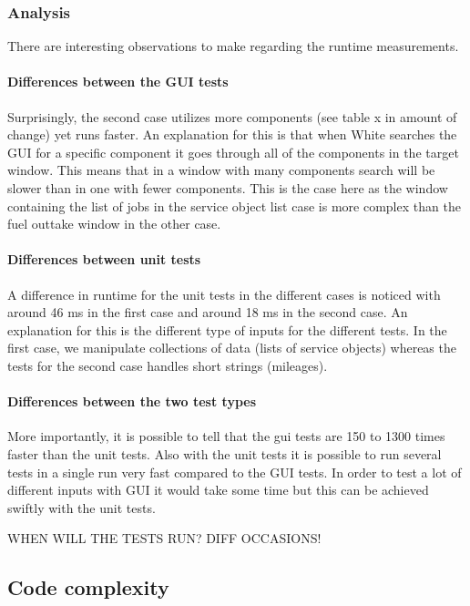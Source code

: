 \documentclass{article}
\begin{document}
			\subsubsection{Analysis}
			There are interesting observations to make regarding the runtime measurements. 

			\paragraph{Differences between the GUI tests}
			Surprisingly, the second case utilizes more components (see table x in amount of change) yet runs faster. An explanation for this is that when White searches the GUI for a specific component it goes through all of the components in the target window. This means that in a window with many components search will be slower than in one with fewer components. This is the case here as the window containing the list of jobs in the service object list case is more complex than the fuel outtake window in the other case.

			\paragraph{Differences between unit tests}
			A difference in runtime for the unit tests in the different cases is noticed with around 46 ms in the first case and around 18 ms in the second case. An explanation for this is the different type of inputs for the different tests. In the first case, we manipulate collections of data (lists of service objects) whereas the tests for the second case handles short strings (mileages).

			\paragraph{Differences between the two test types}			
			More importantly, it is possible to tell that the gui tests are 150 to 1300 times faster than the unit tests. Also with the unit tests it is possible to run several tests in a single run very fast compared to the GUI tests. In order to test a lot of different inputs with GUI it would take some time but this can be achieved swiftly with the unit tests.

			WHEN WILL THE TESTS RUN? DIFF OCCASIONS!

		\subsection{Code complexity}
		
\end{document}
